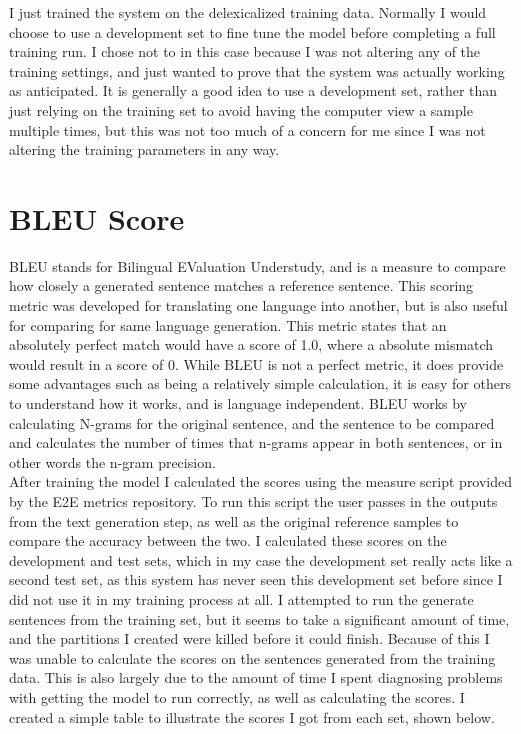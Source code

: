 \documentclass[12pt]{article}
\begin{document}
I just trained the system on the delexicalized training data. Normally I would choose to use a development set to fine tune the model before completing a full training run. I chose not to in this case because I was not altering any of the training settings, and just wanted to prove that the system was actually working as anticipated. It is generally a good idea to use a development set, rather than just relying on the training set to avoid having the computer view a sample multiple times, but this was not too much of a concern for me since I was not altering the training parameters in any way. \\

\section{BLEU Score}
BLEU stands for Bilingual EValuation Understudy, and is a measure to compare how closely a generated sentence matches a reference sentence. This scoring metric was developed for translating one language into another, but is also useful for comparing for same language generation. This metric states that an absolutely perfect match would have a score of 1.0, where a absolute mismatch would result in a score of 0. While BLEU is not a perfect metric, it does provide some advantages such as being a relatively simple calculation, it is easy for others to understand how it works, and is language independent. BLEU works by calculating N-grams for the original sentence, and the sentence to be compared and calculates the number of times that n-grams appear in both sentences, or in other words the n-gram precision. \\

After training the model I calculated the scores using the measure script provided by the E2E metrics repository. To run this script the user passes in the outputs from the text generation step, as well as the original reference samples to compare the accuracy between the two. I calculated these scores on the development and test sets, which in my case the development set really acts like a second test set, as this system has never seen this development set before since I did not use it in my training process at all. I attempted to run the generate sentences from the training set, but it seems to take a significant amount of time, and the partitions I created were killed before it could finish. Because of this I was unable to calculate the scores on the sentences generated from the training data. This is also largely due to the amount of time I spent diagnosing problems with getting the model to run correctly, as well as calculating the scores. I created a simple table to illustrate the scores I got from each set, shown below. 
\end{document}
